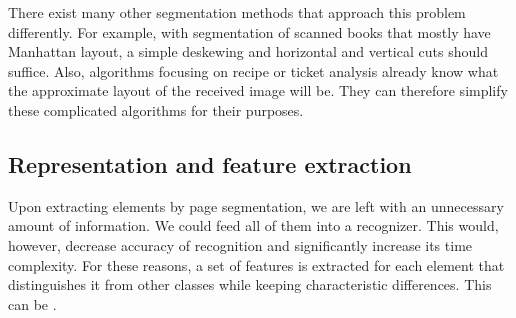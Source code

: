 There exist many other segmentation methods that approach this problem differently. For example, with segmentation of scanned books that mostly have Manhattan layout, a simple deskewing and horizontal and vertical cuts should suffice. Also, algorithms focusing on recipe or ticket analysis already know what the approximate layout of the received image will be. They can therefore simplify these complicated algorithms for their purposes.

\subsection{Representation and feature extraction}

Upon extracting elements by page segmentation, we are left with an unnecessary amount of information. We could feed all of them into a recognizer. This would, however, decrease accuracy of recognition and significantly increase its time complexity. For these reasons, a set of features is extracted for each element that distinguishes it from other classes while keeping characteristic differences. This can be  \citep{featureExtractionBook}.

